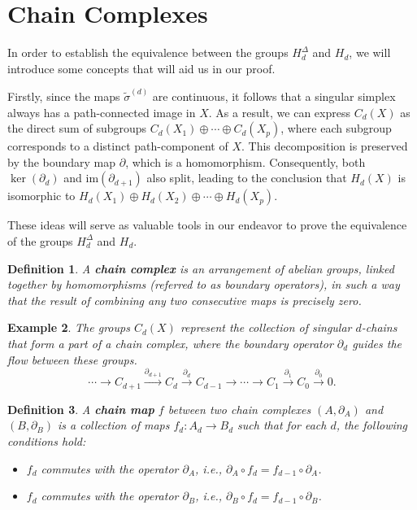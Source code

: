 \documentclass{amsart}
\newtheorem{definition}{Definition}[section]
\newtheorem{example}[definition]{Example}
\begin{document}
\section{Chain Complexes}
In order to establish the equivalence between the groups $H_d^\Delta$ and $H_d$, we will introduce some concepts that will aid us in our proof.

Firstly, since the maps $\tilde{\sigma}^{(d)}$ are continuous, it follows that a singular simplex always has a path-connected image in $X$. As a result, we can express $C_d(X)$ as the direct sum of subgroups $C_d(X_1) \oplus \cdots \oplus C_d(X_p)$, where each subgroup corresponds to a distinct path-component of $X$. This decomposition is preserved by the boundary map $\partial$, which is a homomorphism. Consequently, both $\ker(\partial_d)$ and $\text{im}(\partial_{d+1})$ also split, leading to the conclusion that $H_d(X)$ is isomorphic to $H_d(X_1) \oplus H_d(X_2) \oplus \cdots \oplus H_d(X_p)$.

These ideas will serve as valuable tools in our endeavor to prove the equivalence of the groups $H_d^\Delta$ and $H_d$.

\begin{definition}
A \textbf{chain complex} is an arrangement of abelian groups, linked together by homomorphisms (referred to as boundary operators), in such a way that the result of combining any two consecutive maps is precisely zero.
\end{definition}

\begin{example}
The groups $C_d(X)$ represent the collection of singular $d$-chains that form a part of a chain complex, where the boundary operator $\partial_d$ guides the flow between these groups.
\begin{equation}
\cdots \xrightarrow{} C_{d+1} \xrightarrow{\partial_{d+1}} C_d \xrightarrow{\partial_d} C_{d-1} \xrightarrow{} \cdots \xrightarrow{} C_1 \xrightarrow{\partial_1} C_0 \xrightarrow{\partial_0} 0.
\end{equation}
\end{example}

\begin{definition}
A \textbf{chain map} $f$ between two chain complexes $(A, \partial_A)$ and $(B,\partial_B)$ is a collection of maps $f_d: A_d \rightarrow B_d$ such that for each $d$, the following conditions hold:
\begin{itemize}
    \item $f_d$ commutes with the operator $\partial_A$, i.e., $\partial_A \circ f_d = f_{d-1} \circ \partial_A$.
    \item $f_d$ commutes with the operator $\partial_B$, i.e., $\partial_B \circ f_d = f_{d-1} \circ \partial_B$.
\end{itemize}
\end{definition}
\end{document}
